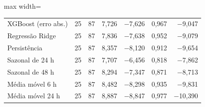 \begin{table}[!htbp]
\begin{adjustbox}{max width=\textwidth}
\begin{tabular}{lrrrrrr}
        XGBoost (erro abs.) & 25 & 87 & 7,726 & $-$7,626 & 0,967 & $-$9,047 \\
        Regressão Ridge & 25 & 87 & 7,836 & $-$7,638 & 0,952 & $-$9,079 \\
        Persistência & 25 & 87 & 8,357 & $-$8,120 & 0,912 & $-$9,654 \\
        Sazonal de 24 h & 25 & 87 & 7,707 & $-$6,456 & 0,818 & $-$7,862 \\
        Sazonal de 48 h & 25 & 87 & 8,294 & $-$7,347 & 0,871 & $-$8,713 \\
        Média móvel 6 h & 25 & 87 & 8,482 & $-$8,298 & 0,935 & $-$9,831 \\
        Média móvel 24 h & 25 & 87 & 8,887 & $-$8,847 & 0,977 & $-$10,390 \\
        \bottomrule
    \end{tabular}
    \end{adjustbox}
\end{table}
